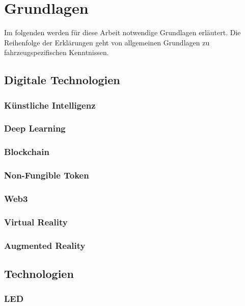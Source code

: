 \chapter{Grundlagen}
\label{cha:Grundlagen}

Im folgenden werden für diese Arbeit notwendige Grundlagen erläutert. Die Reihenfolge der Erklärungen geht von allgemeinen Grundlagen zu fahrzeugspezifischen Kenntnissen.
\section{Digitale Technologien}
\subsection{Künstliche Intelligenz}
\subsection{Deep Learning}

\subsection{Blockchain}

\subsection{Non-Fungible Token}
\subsection{Web3}
\subsection{Virtual Reality}
\subsection{Augmented Reality}
\section{Technologien}
\subsection{LED}
